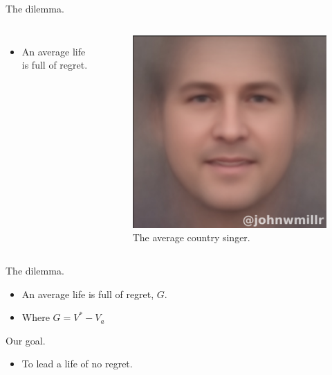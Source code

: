 \documentclass[10pt]{beamer}
\begin{document}
\begin{frame}[fragile]{The dilemma.}
\begin{columns}
\centering
\begin{itemize}
    \item An average life is full of regret.
\end{itemize}

\centering
\begin{figure}
    \centering
    \includegraphics[scale=0.4]{images/average_country_singer.png} 
    \caption{\footnotesize{The average country singer.}}
\end{figure}
\end{columns}
\end{frame}

\begin{frame}[fragile]{The dilemma.}
\begin{itemize}
    \item An average life is full of regret, $G$.
    \item Where $G = V^* - V_a$
\end{itemize}
\end{frame}

\begin{frame}[fragile]{Our goal.}
\begin{itemize}
    \item To lead a life of no regret.
\end{itemize}
\end{frame}
\end{document}
